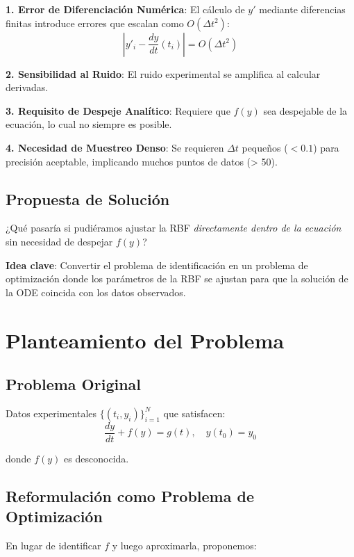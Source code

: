 \documentclass[11pt,a4paper]{article}
\begin{document}
\textbf{1. Error de Diferenciación Numérica}: El cálculo de $y'$ mediante diferencias finitas introduce errores que escalan como $O(\Delta t^2)$:
\begin{equation}
|y'_i - \frac{dy}{dt}(t_i)| = O(\Delta t^2)
\end{equation}

\textbf{2. Sensibilidad al Ruido}: El ruido experimental se amplifica al calcular derivadas.

\textbf{3. Requisito de Despeje Analítico}: Requiere que $f(y)$ sea despejable de la ecuación, lo cual no siempre es posible.

\textbf{4. Necesidad de Muestreo Denso}: Se requieren $\Delta t$ pequeños ($< 0.1$) para precisión aceptable, implicando muchos puntos de datos (> 50).

\subsection{Propuesta de Solución}

¿Qué pasaría si pudiéramos ajustar la RBF \textit{directamente dentro de la ecuación} sin necesidad de despejar $f(y)$?

\textbf{Idea clave}: Convertir el problema de identificación en un problema de optimización donde los parámetros de la RBF se ajustan para que la solución de la ODE coincida con los datos observados.

\section{Planteamiento del Problema}

\subsection{Problema Original}

Datos experimentales $\{(t_i, y_i)\}_{i=1}^{N}$ que satisfacen:
\begin{equation}
\frac{dy}{dt} + f(y) = g(t), \quad y(t_0) = y_0
\label{eq:ode}
\end{equation}

donde $f(y)$ es desconocida.

\subsection{Reformulación como Problema de Optimización}

En lugar de identificar $f$ y luego aproximarla, proponemos:
\end{document}
